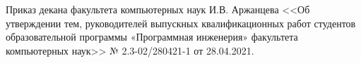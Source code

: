 Приказ декана факультета компьютерных наук И.В. Аржанцева <<Об утверждении тем, руководителей выпускных квалификационных работ студентов образовательной программы «Программная инженерия» факультета компьютерных наук>> № 2.3-02/280421-1 от 28.04.2021.